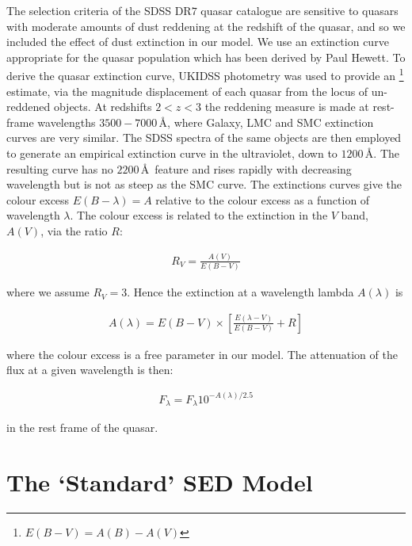 The selection criteria of the SDSS DR$7$ quasar catalogue are sensitive to quasars with moderate amounts of dust reddening at the redshift of the quasar, and so we included the effect of dust extinction in our model. 
We use an extinction curve appropriate for the quasar population which has been derived by Paul Hewett. 
To derive the quasar extinction curve, UKIDSS photometry was used to provide an \ebv\footnote{$E(B-V)=A(B)-A(V)$} estimate, via the magnitude displacement of each quasar from the locus of un-reddened objects. 
At redshifts $2 < z < 3$ the reddening measure is made at rest-frame wavelengths $3500-7000$\,\AA, where Galaxy, LMC and SMC extinction curves are very similar. 
The SDSS spectra of the same objects are then employed to generate an empirical extinction curve in the ultraviolet, down to $1200$\,\AA. 
The resulting curve has no $2200$\,\AA\, feature and rises rapidly with decreasing wavelength but is not as steep as the SMC curve. 
The extinctions curves give the colour excess $E(B-\lambda) = A$ relative to the colour excess \ebv as a function of wavelength $\lambda$. 
The colour excess \ebv is related to the extinction in the $V$ band, $A(V)$, via the ratio $R$: 

\begin{eqnarray}
  R_V = \frac{A(V)}{E(B-V)}
\end{eqnarray}

where we assume $R_V = 3$. 
Hence the extinction at a wavelength lambda $A(\lambda)$ is 

\begin{eqnarray}
  A(\lambda) = E(B-V) \times \left[ \frac{E(\lambda-V)}{E(B-V)} + R \right] 
\end{eqnarray}

where the colour excess \ebv is a free parameter in our model. 
The attenuation of the flux at a given wavelength is then:

\begin{eqnarray}
  F_\lambda = F_\lambda10^{-A(\lambda)/2.5}
\end{eqnarray}

in the rest frame of the quasar. 

\section{The `Standard' SED Model} 

